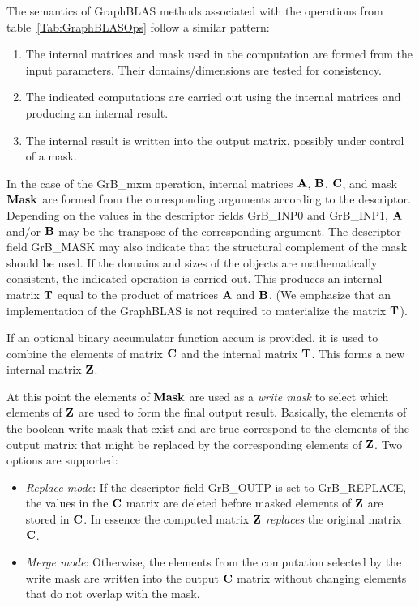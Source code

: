 The semantics of GraphBLAS methods associated with the operations from table~\ref{Tab:GraphBLASOps} follow a similar pattern:
\begin{enumerate}
\item The internal matrices and mask used in the computation are formed from the input parameters.  Their domains/dimensions are tested for consistency.
\item The indicated computations are carried out using the internal matrices and producing an internal result.
\item The internal result is written into the output matrix, possibly under control of a mask.
\end{enumerate}
In the case of the {\sf GrB\_mxm} operation, internal matrices ${\bf A}$, ${\bf B}$, ${\bf C}$, and mask ${\bf Mask}$ are formed from
the corresponding arguments according to the descriptor.  Depending on
the values in the descriptor fields {\sf GrB\_INP0} and {\sf GrB\_INP1},  ${\bf A}$ and/or ${\bf B}$ may be the transpose of the corresponding argument.
The descriptor field {\sf GrB\_MASK} may also indicate that the structural complement of the mask 
should be used.  If the domains and sizes of the objects are mathematically consistent, the indicated operation is carried out.
This produces an internal matrix ${\bf T}$ equal to the product of matrices ${\bf A}$ and ${\bf B}$.
(We emphasize that an implementation
of the GraphBLAS is not required to materialize the matrix ${\bf T}$).

If an optional binary accumulator function {\sf accum} is provided, it is used to combine the elements of 
matrix ${\bf C}$ and the internal matrix ${\bf T}$.  This forms a new internal matrix ${\bf Z}$.   

At this point the elements of ${\bf Mask}$ are used as a \emph{write mask} to select which elements of ${\bf Z}$ are 
used to form the final output result.  Basically, the elements of the boolean write mask that exist and are true 
correspond to the elements of the output matrix that might be replaced by the corresponding elements of ${\bf Z}$.
Two options are supported: 
\begin{itemize}
	\item \emph{Replace mode}: If the descriptor field {\sf GrB\_OUTP} is set to {\sf GrB\_REPLACE}, the 
		values in the ${\bf C}$ matrix are deleted before masked elements of ${\bf Z}$ are stored 
		in ${\bf C}$.  In essence the computed matrix ${\bf Z}$ \emph{replaces} the original matrix ${\bf C}$.
	\item \emph{Merge mode}: Otherwise, the elements from the computation selected by the 
		write mask are written into the output ${\bf C}$ matrix without changing elements
		that do not overlap with the mask.
\end{itemize}


